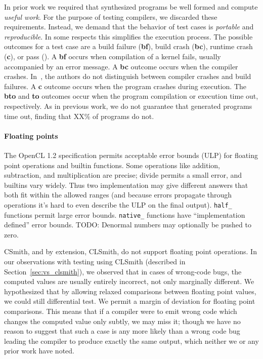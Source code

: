 In prior work we required that synthesized programs be well formed and compute \emph{useful work}. For the purpose of testing compilers, we discarded these requirements. Instead, we demand that the behavior of test cases is \emph{portable} and \emph{reproducible}. In some respects this simplifies the execution process. The possible outcomes for a test case are a build failure (\textbf{bf}), build crash (\textbf{bc}), runtime crash (\textbf{c}), or pass (\textbf{\cmark}). A \textbf{bf} occurs when compilation of a kernel fails, usually accompanied by an error message. A \textbf{bc} outcome occurs when the compiler crashes. In~\cite{Lidbury2015a}, the authors do not distinguish between compiler crashes and build failures. A \textbf{c} outcome occurs when the program crashes during execution. The \textbf{bto} and \textbf{to} outcomes occur when the program compilation or execution time out, respectively. As in previous work, we do not guarantee that generated programs time out, finding that XX\% of programs do not.

\paragraph{Floating points} The OpenCL 1.2 specification permits acceptable error bounds (ULP) for floating point operations and builtin functions. Some operations like addition, subtraction, and multiplication are precise; divide permits a small error, and builtins vary widely. Thus two implementation may give different answers that both fit within the allowed ranges (and because errors propagate through operations it's hard to even describe the ULP on the final output). \texttt{half\_} functions permit large error bounds. \texttt{native\_} functions have ``implementation defined'' error bounds. TODO: Denormal numbers may optionally be pushed to zero.

CSmith, and by extension, CLSmith, do not support floating point operations. In our observations with testing using CLSmith (described in Section~\ref{sec:vs_clsmith}), we observed that in cases of wrong-code bugs, the computed values are usually entirely incorrect, not only marginally different. We hypothesized that by allowing relaxed comparisons between floating point values, we could still differential test. We permit a margin of deviation for floating point comparisons. This means that if a compiler were to emit wrong code which changes the computed value only subtly, we may miss it; though we have no reason to suggest that such a case is any more likely than a wrong code bug leading the compiler to produce exactly the same output, which neither we or any prior work have noted.


